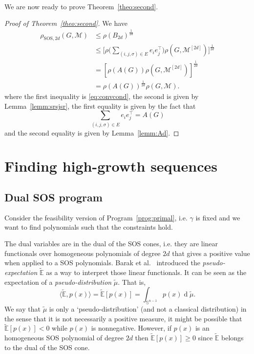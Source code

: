 \documentclass{sig-alternate-05-2015}
\DeclareMathOperator{\newdiff}{d} %
\newcommand{\dif}{\newdiff\!}
\newcommand{\1}{\mathbf{1}}
\newcommand{\la}{\langle}
\newcommand{\ra}{\rangle}
\theoremstyle{definition}
\newcommand{\Tr}{\top}
\newcommand{\A}{\mathcal{M}}
\newcommand{\G}{G}
\newcommand{\jsrsos}[1][2d]{\rho_{\mathrm{SOS},#1}(\G,\A)}
\newcommand{\pE}{\widetilde{\mathbb{E}}}
\newcommand{\pmu}{\widetilde{\mu}}
\newcommand{\Arcs}{E}
\begin{document}
We are now ready to prove Theorem~\ref{theo:second}.

\begin{proof}[Proof of Theorem~\ref{theo:second}]
  We have
  \begin{align*}
    \jsrsos
    & \leq \rho(B_{2d})^{\frac{1}{2d}}\\
    & \leq \Bigg[\rho\Big(\sum_{(i,j,\sigma) \in \Arcs} e_ie_j^\Tr \Big) \rho(\G,\A^{[2d]})\Bigg]^{\frac{1}{2d}}\\
    & = [\rho(A(\G)) \rho(\G,\A^{[2d]})]^{\frac{1}{2d}}\\
    & = \rho(A(\G))^{\frac{1}{2d}} \rho(\G,\A).
  \end{align*}
  where the first inequality is \eqref{eq:convcond},
  the second is given by Lemma~\ref{lemm:srsjsr},
  the first equality is given by the fact that
  \[ \sum_{(i,j,\sigma) \in \Arcs} e_ie_j^\Tr  = A(\G) \]
  and the second equality is given by Lemma~\ref{lemm:Ad}.
\end{proof}

\section{Finding high-growth sequences}
\label{sec:dualalgo}
\subsection{Dual SOS program}
\label{sec:dual}
Consider the feasibility version of Program~\ref{prog:primal},
i.e. $\gamma$ is fixed and we want to find polynomials such that the
constraints hold.

The dual variables are in the dual of the SOS cones,
i.e. they are linear functionals over homogeneous polynomials of degree $2d$
that gives a positive value when applied to a SOS polynomials.
Barak et al.~\cite{barak2012hypercontractivity} introduced the \emph{pseudo-expectation} $\pE$ as a way to interpret those linear functionals.
It can be seen as the expectation of a \emph{pseudo-distribution} $\pmu$.
That is,
\begin{equation}
  \label{eq:exp}
  \la \pE, p(x) \ra = \pE[p(x)] = \int_{\mathbb{S}^{n-1}} p(x) \dif \pmu.
\end{equation}
We say that $\pmu$
is only a `pseudo-distribution' (and not a classical distribution) in the sense that it
is not necessarily a positive measure,
it might be possible that $\pE[p(x)] < 0$ while $p(x)$ is nonnegative.
However, if $p(x)$ is an homogeneous SOS polynomial of degree $2d$
then $\pE[p(x)] \geq 0$ since $\pE$ belongs to the dual of the SOS cone.
\end{document}
